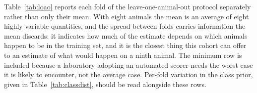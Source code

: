 Table~\ref{tab:loao} reports each fold of the leave-one-animal-out
protocol separately rather than only their mean. With eight animals the
mean is an average of eight highly variable quantities, and the spread
between folds carries information the mean discards: it indicates how
much of the estimate depends on which animals happen to be in the
training set, and it is the closest thing this cohort can offer to an
estimate of what would happen on a ninth animal. The minimum row is
included because a laboratory adopting an automated scorer needs the
worst case it is likely to encounter, not the average case. Per-fold
variation in the class prior, given in Table~\ref{tab:classdist}, should
be read alongside these rows.



